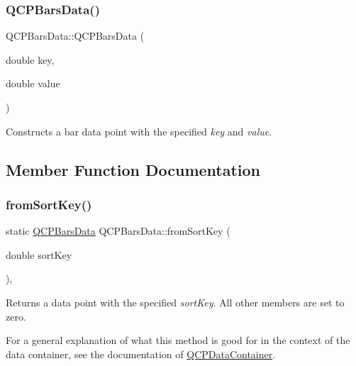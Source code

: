 \subsubsection{\texorpdfstring{Q\+C\+P\+Bars\+Data()}{QCPBarsData()}\hspace{0.1cm}{\footnotesize\ttfamily [2/2]}}
{\footnotesize\ttfamily Q\+C\+P\+Bars\+Data\+::\+Q\+C\+P\+Bars\+Data (\begin{DoxyParamCaption}\item[{double}]{key,  }\item[{double}]{value }\end{DoxyParamCaption})}

Constructs a bar data point with the specified {\itshape key} and {\itshape value}. 

\subsection{Member Function Documentation}
\mbox{\label{class_q_c_p_bars_data_ad170d4e90498005ec319338910252ba8}} 
\subsubsection{\texorpdfstring{from\+Sort\+Key()}{fromSortKey()}}
{\footnotesize\ttfamily static \hyperlink{class_q_c_p_bars_data}{Q\+C\+P\+Bars\+Data} Q\+C\+P\+Bars\+Data\+::from\+Sort\+Key (\begin{DoxyParamCaption}\item[{double}]{sort\+Key }\end{DoxyParamCaption})\hspace{0.3cm}{\ttfamily [inline]}, {\ttfamily [static]}}

Returns a data point with the specified {\itshape sort\+Key}. All other members are set to zero.

For a general explanation of what this method is good for in the context of the data container, see the documentation of \hyperlink{class_q_c_p_data_container}{Q\+C\+P\+Data\+Container}. \mbox{\label{class_q_c_p_bars_data_a8c1d09e63b0e90a6c1fba56ddeaa8964}} 
